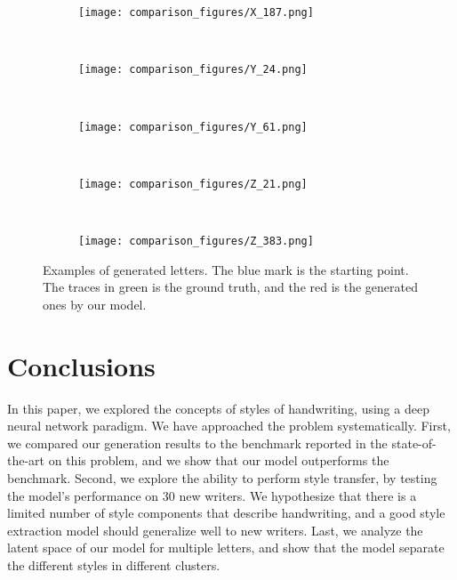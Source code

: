 \documentclass[conference]{IEEEtran}
\begin{document}
\begin{figure*}[!htbp]
\begin{subfigure}[b]{0.15\textwidth}
        \texttt{[image: comparison\_figures/X\_187.png]}
    \end{subfigure}
    ~
    \begin{subfigure}[b]{0.15\textwidth}
        \texttt{[image: comparison\_figures/Y\_24.png]}
    \end{subfigure}
    ~
    \begin{subfigure}[b]{0.15\textwidth}
        \texttt{[image: comparison\_figures/Y\_61.png]}
    \end{subfigure}
    ~
    \begin{subfigure}[b]{0.15\textwidth}
        \texttt{[image: comparison\_figures/Z\_21.png]}
    \end{subfigure}
    ~
    \begin{subfigure}[b]{0.15\textwidth}
        \texttt{[image: comparison\_figures/Z\_383.png]}
    \end{subfigure}
    \caption{Examples of generated letters. The blue mark is the starting point. The traces in green is the ground truth, and the red is the generated ones by our model.}
    \label{fig:letters_examples}
\end{figure*}


\section{Conclusions}
\par In this paper, we explored the concepts of styles of handwriting, using a deep  neural network paradigm. We have approached the problem systematically. First, we compared our generation results to the benchmark reported in the state-of-the-art on this problem, and we show that our model outperforms the benchmark. Second, we explore the ability to perform style transfer, by testing the model's performance on 30 new writers. We hypothesize that there is a limited number of style components that describe handwriting, and a good style extraction model should generalize well to new writers. Last, we analyze the latent space of our model for multiple letters, and show that the model separate the different styles in different clusters. 
\end{document}
